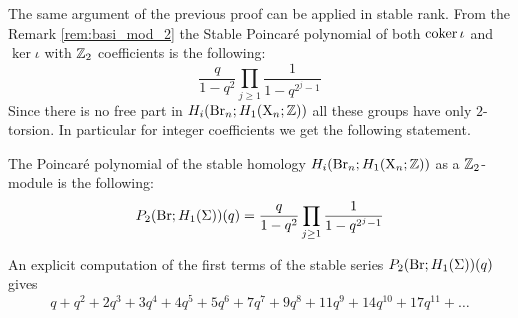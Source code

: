 The same argument of the previous proof can be applied in stable rank. From the Remark \ref{rem:basi_mod_2} the Stable Poincar\'e polynomial of both $\operatorname{\mathrm{coker}} \iota$ and $\ker \iota$ with $\mathbb{Z}_2$ coefficients is the following:
$$
\frac{q}{1-q^2} \prod_{j \geq 1} \frac{1}{1-q^{2^j-1}}
$$
Since there is no free part in $H_i(\operatorname{Br}_n;H_1(\mathrm{X}_n;\mathbb{Z}))$ all these groups have only $2$-torsion. In particular for integer coefficients we get the following statement.
\begin{thm}\label{thm:stablepoincare}
The Poincar\'e polynomial of the stable homology $H_i(\operatorname{Br}_n;H_1(\mathrm{X}_n;\mathbb{Z}))$ as a $\mathbb{Z}_2$-module is the following:
$$
P_2(\operatorname{Br};H_1(\Sigma))(q) = \frac{q}{1-q^2} \prod_{j \geq 1} \frac{1}{1-q^{2^j-1}}
$$
\end{thm}
An explicit computation of the first terms of the stable series $P_2(\operatorname{Br};H_1(\Sigma))(q)$ gives
$$
q+q^2+ 2q^3 + 3q^4 + 4q^5 + 5q^6 + 7q^7 + 9 q^8 + 11q^9 + 14q^{10} + 17 q^{11} + \ldots
$$
	
